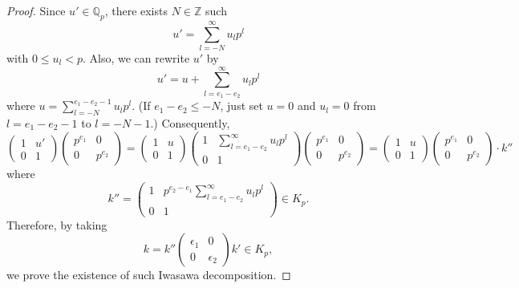 \documentclass[a4paper, 12pt]{article}
\theoremstyle{Mydefinition}
\theoremstyle{Mytheorem}
\begin{document}
\begin{enumerate}
\begin{proof}
    Since $u'\in\mathbb{Q}_p$, there exists $N\in\mathbb{Z}$ such
    \begin{equation}
        u' = \sum_{l=-N}^\infty u_l p^l
    \end{equation}
    with $0\leq u_l<p$. Also, we can rewrite $u'$ by
    \begin{equation}
        u' = u+\sum_{l=e_1-e_2}^\infty u_l p^l
    \end{equation}
    where $u = \sum_{l=-N}^{e_1-e_2-1}u_lp^l$. (If $e_1-e_2\leq -N$, just set $u=0$ and $u_l=0$ from $l=e_1-e_2 - 1$ to $l=-N-1$.) Consequently,
    \begin{equation}
        \begin{pmatrix}
            1 & u' \\ 0 & 1
        \end{pmatrix}
        \begin{pmatrix}
            p^{e_1} & 0 \\ 0 & p^{e_2}
        \end{pmatrix}
        =
        \begin{pmatrix}
            1 & u \\ 0 & 1
        \end{pmatrix}
        \begin{pmatrix}
            1 & \sum_{l=e_1-e_2}^\infty u_lp^l \\ 0 & 1
        \end{pmatrix}
        \begin{pmatrix}
            p^{e_1} & 0 \\ 0 & p^{e_2}
        \end{pmatrix}
        =
        \begin{pmatrix}
            1 & u \\ 0 & 1
        \end{pmatrix}
        \begin{pmatrix}
            p^{e_1} & 0 \\ 0 & p^{e_2}
        \end{pmatrix}\cdot k''
    \end{equation}
    where
    \begin{equation}
        k''=\begin{pmatrix}
            1 & p^{e_2-e_1}\sum_{l=e_1-e_2}^\infty u_lp^l \\ 0 & 1
        \end{pmatrix}\in K_p.
    \end{equation}
    Therefore, by taking 
    \begin{equation}
        k=k''\begin{pmatrix}
            \epsilon_1 & 0\\
            0 & \epsilon_2
        \end{pmatrix}k'\in K_p,
    \end{equation}
    we prove the existence of such Iwasawa decomposition.
    

\end{proof}
\end{enumerate}
\end{document}
